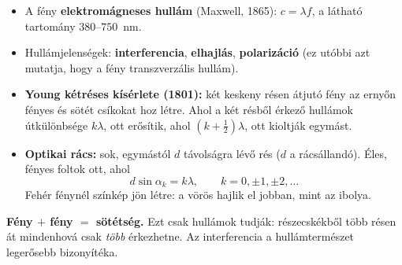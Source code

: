 \documentclass[12pt]{article}
\begin{document}
\begin{minipage}[t]{0.58\linewidth}\vspace{0pt}
\begin{itemize}
  \item A fény \textbf{elektromágneses hullám} (Maxwell, 1865): $c = \lambda f$, a látható
    tartomány $380$--$750$~nm.
  \item Hullámjelenségek: \textbf{interferencia}, \textbf{elhajlás}, \textbf{polarizáció}
    (ez utóbbi azt mutatja, hogy a fény transzverzális hullám).
  \item \textbf{Young kétréses kísérlete (1801):} két keskeny résen átjutó fény az ernyőn
    fényes és sötét csíkokat hoz létre. Ahol a két résből érkező hullámok útkülönbsége
    $k\lambda$, ott erősítik, ahol $(k+\tfrac12)\lambda$, ott kioltják egymást.
  \item \textbf{Optikai rács:} sok, egymástól $d$ távolságra lévő rés ($d$ a rácsállandó).
    Éles, fényes foltok ott, ahol
    \[ d\sin\alpha_k = k\lambda, \qquad k = 0, \pm1, \pm2, \dots \]
    Fehér fénynél színkép jön létre: a vörös hajlik el jobban, mint az ibolya.
\end{itemize}
\end{minipage}\hfill
\begin{minipage}[t]{0.40\linewidth}\vspace{0pt}\centering
{}
\end{minipage}

\begin{fontos}
\centering\textbf{Fény $+$ fény $=$ sötétség.} Ezt csak hullámok tudják: részecskékből több
résen át mindenhová csak \emph{több} érkezhetne. Az interferencia a hullámtermészet
legerősebb bizonyítéka.
\end{fontos}
\end{document}
